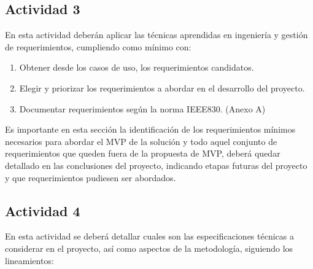\documentclass[]{article}
\begin{document}
\subsection{Actividad 3}

En esta actividad deberán aplicar las técnicas aprendidas en ingeniería y gestión de requerimientos, cumpliendo como mínimo con:

\begin{enumerate}
    \item Obtener desde los casos de uso, los requerimientos candidatos.
    \item Elegir y priorizar los requerimientos a abordar en el desarrollo del proyecto.
    \item Documentar requerimientos según la norma IEEE830. (Anexo A)
\end{enumerate} 

Es importante en esta sección la identificación de los requerimientos mínimos necesarios para abordar el MVP de la solución y todo aquel conjunto de requerimientos que queden fuera de la propuesta de MVP, deberá
quedar detallado en las conclusiones del proyecto, indicando etapas futuras del proyecto y que requerimientos pudiesen ser abordados.

\subsection{Actividad 4}

En esta actividad se deberá detallar cuales son las especificaciones técnicas a considerar en el proyecto, así como aspectos de la metodología, siguiendo los lineamientos:
\end{document}
